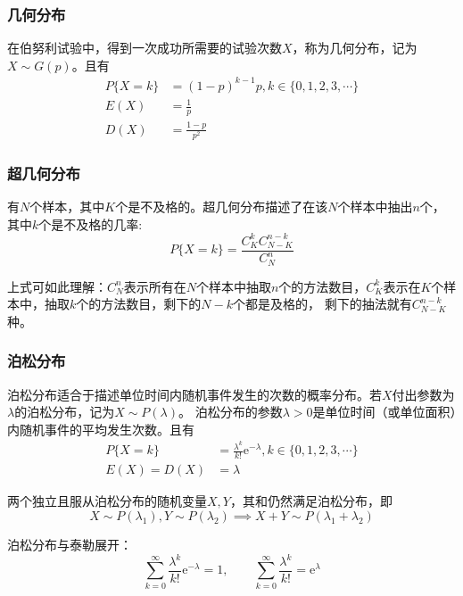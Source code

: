 \subsubsection{几何分布}
在伯努利试验中，得到一次成功所需要的试验次数$X$，称为几何分布，记为$X\sim G(p)$。且有
\begin{align}
    P\{X=k\} & = (1-p)^{k-1}p, k\in\{0,1,2,3,\cdots \} \label{eq:几何分布律} \\
    E(X)     & = \frac{1}{p} \label{eq:几何分布期望}                         \\
    D(X)     & = \frac{1-p}{p^2} \label{eq:几何分布方差}
\end{align}

\subsubsection{超几何分布}
有$N$个样本，其中$K$个是不及格的。超几何分布描述了在该$N$个样本中抽出$n$个，其中$k$个是不及格的几率:
\[ P\{ X=k \} = \frac{C_K^k C_{N-K}^{n-k}}{C_N^n} \]

上式可如此理解：$C_N^n$表示所有在$N$个样本中抽取$n$个的方法数目，$C_K^k$表示在$K$个样本中，抽取$k$个的方法数目，剩下的$N-k$个都是及格的，
剩下的抽法就有$C_{N-K}^{n-k}$种。

\subsubsection{泊松分布}
泊松分布适合于描述单位时间内随机事件发生的次数的概率分布。若$X$付出参数为$\lambda$的泊松分布，记为$X\sim P(\lambda)$。
泊松分布的参数$\lambda>0$是单位时间（或单位面积）内随机事件的平均发生次数。且有
\begin{align}
    P\{ X=k \} & = \frac{\lambda^k}{k!}\mathrm{e}^{-\lambda}, k\in\{0,1,2,3,\cdots\} \label{eq:泊松分布分布律} \\
    E(X)=D(X)  & =\lambda \label{eq:泊松分布期望方差}
\end{align}

两个独立且服从泊松分布的随机变量$X,Y$，其和仍然满足泊松分布，即
\[ X\sim P(\lambda_1), Y\sim P(\lambda_2) \implies X+Y \sim P(\lambda_1+\lambda_2) \]

泊松分布与泰勒展开：
\[
    \sum_{k=0}^\infty \frac{\lambda^k}{k!}\mathrm{e}^{-\lambda} = 1,
    \qquad
    \sum_{k=0}^\infty \frac{\lambda^k}{k!} = \mathrm{e}^\lambda
\]

